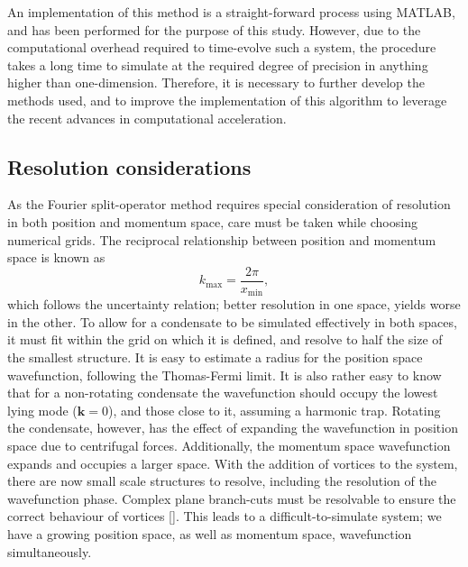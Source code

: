 An implementation of this method is a straight-forward process using MATLAB, and has been performed for the purpose of this study. However, due to the computational overhead required to time-evolve such a system, the procedure takes a long time to simulate at the required degree of precision in anything higher than one-dimension. Therefore, it is necessary to further develop the methods used, and to improve the implementation of this algorithm to leverage the recent advances in computational acceleration.

\subsection{Resolution considerations}
As the Fourier split-operator method requires special consideration of resolution in both position and momentum space, care must be taken while choosing numerical grids. The reciprocal relationship between position and momentum space is known as \begin{equation}
    k_{\text{max}} = \frac{2\pi}{x_{\text{min}}},
\end{equation}
which follows the uncertainty relation; better resolution in one space, yields worse in the other. To allow for a condensate to be simulated effectively in both spaces, it must fit within the grid on which it is defined, and resolve to half the size of the smallest structure. It is easy to estimate a radius for the position space wavefunction, following the Thomas-Fermi limit. It is also rather easy to know that for a non-rotating condensate the wavefunction should occupy the lowest lying mode ($\mathbf{k}=0$), and those close to it, assuming a harmonic trap. Rotating the condensate, however, has the effect of expanding the wavefunction in position space due to centrifugal forces. Additionally, the momentum space wavefunction expands and occupies a larger space. With the addition of vortices to the system, there are now small scale structures to resolve, including the resolution of the wavefunction phase. Complex plane branch-cuts must be resolvable to ensure the correct behaviour of vortices []. This leads to a difficult-to-simulate system; we have a growing position space, as well as momentum space, wavefunction simultaneously.


